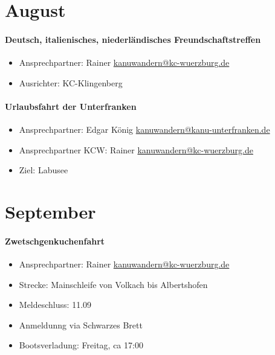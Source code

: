 \documentclass[12pt, a4paper]{report}
\begin{document}
\section*{August}\paragraph{Deutsch, italienisches, niederländisches Freundschaftstreffen}
\begin{itemize}
    \item Ansprechpartner: Rainer \href{mailto:kanuwandern@kc-wuerzburg.de}{kanuwandern@kc-wuerzburg.de}
    \item Ausrichter: KC-Klingenberg
\end{itemize}

\paragraph{Urlaubsfahrt der Unterfranken}
\begin{itemize}
    \item Ansprechpartner: Edgar König \href{mailto:kanuwandern@kanu-unterfranken.de}{kanuwandern@kanu-unterfranken.de}
    \item Ansprechpartner KCW: Rainer \href{mailto:kanuwandern@kc-wuerzburg.de}{kanuwandern@kc-wuerzburg.de}
    \item Ziel: Labusee
\end{itemize}

\section*{September}\paragraph{Zwetschgenkuchenfahrt}
\begin{itemize}
    \item Ansprechpartner: Rainer \href{mailto:kanuwandern@kc-wuerzburg.de}{kanuwandern@kc-wuerzburg.de}
    \item Strecke: Mainschleife von Volkach bis Albertshofen
    \item Meldeschluss: 11.09
    \item Anmeldunng via Schwarzes Brett
    \item Bootsverladung: Freitag, ca 17:00
\end{itemize}
\end{document}
